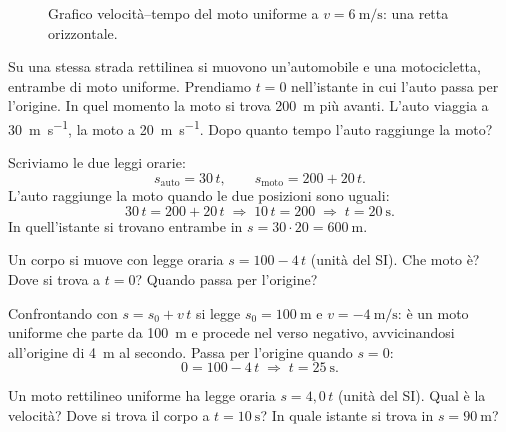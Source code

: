 \begin{figure}[!htbp]
    \centering
    \caption{Grafico velocità--tempo del moto uniforme a $v = \SI{6}{\metre\per\second}$: una retta orizzontale.}
    \label{fig:vt-uniforme}
\end{figure}

\begin{testexample}
Su una stessa strada rettilinea si muovono un'automobile e una motocicletta, entrambe di moto uniforme. Prendiamo $t = 0$ nell'istante in cui l'auto passa per l'origine. In quel momento la moto si trova \SI{200}{\metre} più avanti. L'auto viaggia a \SI{30}{\metre\per\second}, la moto a \SI{20}{\metre\per\second}. Dopo quanto tempo l'auto raggiunge la moto?

Scriviamo le due leggi orarie:
\[ s_\text{auto} = 30\,t, \qquad s_\text{moto} = 200 + 20\,t. \]
L'auto raggiunge la moto quando le due posizioni sono uguali:
\[ 30\,t = 200 + 20\,t \;\Longrightarrow\; 10\,t = 200 \;\Longrightarrow\; t = \SI{20}{\second}. \]
In quell'istante si trovano entrambe in $s = 30 \cdot 20 = \SI{600}{\metre}$.
\end{testexample}

\begin{testexample}
Un corpo si muove con legge oraria $s = 100 - 4\,t$ (unità del SI). Che moto è? Dove si trova a $t = 0$? Quando passa per l'origine?

Confrontando con $s = s_0 + v\,t$ si legge $s_0 = \SI{100}{\metre}$ e $v = \SI{-4}{\metre\per\second}$: è un moto uniforme che parte da \SI{100}{\metre} e procede nel verso negativo, avvicinandosi all'origine di \SI{4}{\metre} al secondo. Passa per l'origine quando $s = 0$:
\[ 0 = 100 - 4\,t \;\Longrightarrow\; t = \SI{25}{\second}. \]
\end{testexample}

\begin{esercizio}
Un moto rettilineo uniforme ha legge oraria $s = 4{,}0\,t$ (unità del SI). Qual è la velocità? Dove si trova il corpo a $t = \SI{10}{\second}$? In quale istante si trova in $s = \SI{90}{\metre}$?\\
\end{esercizio}

